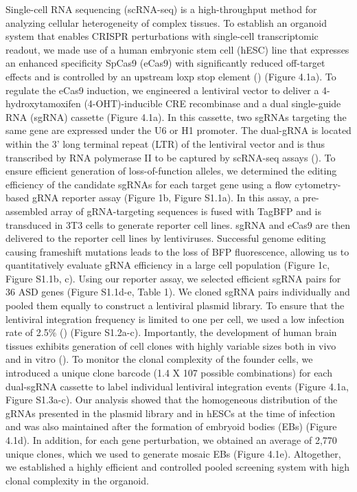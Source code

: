Single-cell RNA sequencing (scRNA-seq) is a high-throughput method for analyzing cellular heterogeneity of complex tissues. To establish an organoid system that enables CRISPR perturbations with single-cell transcriptomic readout, we made use of a human embryonic stem cell (hESC) line that expresses an enhanced specificity SpCas9 (eCas9) with significantly reduced off-target effects and is controlled by an upstream loxp stop element (\cite{esk_human_2020}) (Figure 4.1a). To regulate the eCas9 induction, we engineered a lentiviral vector to deliver a 4-hydroxytamoxifen (4-OHT)-inducible CRE recombinase and a dual single-guide RNA (sgRNA) cassette (Figure 4.1a). In this cassette, two sgRNAs targeting the same gene are expressed under the U6 or H1 promoter. The dual-gRNA is located within the 3' long terminal repeat (LTR) of the lentiviral vector and is thus transcribed by RNA polymerase II to be captured by scRNA-seq assays (\cite{datlinger_pooled_2017}). To ensure efficient generation of loss-of-function alleles, we determined the editing efficiency of the candidate sgRNAs for each target gene using a flow cytometry-based gRNA reporter assay (Figure  1b, Figure S1.1a). In this assay, a pre-assembled array of gRNA-targeting sequences is fused with TagBFP and is transduced in 3T3 cells to generate reporter cell lines. sgRNA and eCas9 are then delivered to the reporter cell lines by lentiviruses. Successful genome editing causing frameshift mutations leads to the loss of BFP fluorescence, allowing us to quantitatively evaluate gRNA efficiency in a large cell population (Figure  1c, Figure S1.1b, c). Using our reporter assay, we selected efficient sgRNA pairs for 36 ASD genes (Figure S1.1d-e, Table 1).  
We cloned sgRNA pairs individually and pooled them equally to construct a lentiviral plasmid library. To ensure that the lentiviral integration frequency is limited to one per cell, we used a low infection rate of 2.5\% (\cite{doench_am_2018}) (Figure S1.2a-c). Importantly, the development of human brain tissues exhibits generation of cell clones with highly variable sizes both in vivo and in vitro (\cite{esk_human_2020,bizzotto_landmarks_2021}). To monitor the clonal complexity of the founder cells, we introduced a unique clone barcode (1.4 X 107 possible combinations) for each dual-sgRNA cassette to label individual lentiviral integration events (Figure 4.1a, Figure S1.3a-c). Our analysis showed that the homogeneous distribution of the gRNAs presented in the plasmid library and in hESCs at the time of infection and was also maintained after the formation of embryoid bodies (EBs) (Figure 4.1d). In addition, for each gene perturbation, we obtained an average of 2,770 unique clones, which we used to generate mosaic EBs (Figure 4.1e). Altogether, we established a highly efficient and controlled pooled screening system with high clonal complexity in the organoid. 

